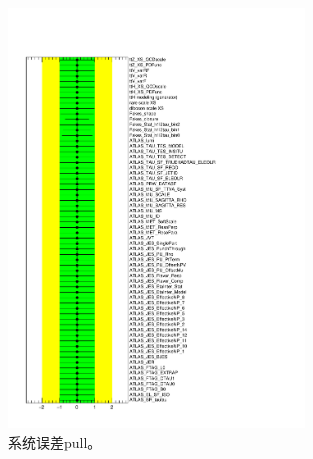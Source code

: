 \begin{figure}[htbp]
\centering
\includegraphics[width=0.7\textwidth, keepaspectratio]{fig/OneLepTwoTaus/NuisPar.pdf}
\caption{\ltwotau 系统误差pull。}
\label{Fig:1l2tau.nuispar}
\end{figure}

